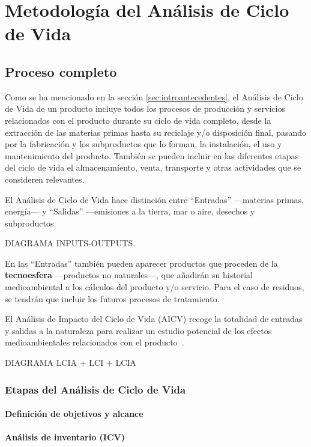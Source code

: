 \chapter{Metodología del Análisis de Ciclo de Vida}
\section{Proceso completo}

Como se ha mencionado en la sección \ref{sec:introantecedentes}, el Análisis de Ciclo de Vida de un producto incluye todos los procesos de producción y servicios relacionados con el producto durante su ciclo de vida completo, desde la extracción de las materias primas hasta su reciclaje y/o disposición final, pasando por la fabricación y los subproductos que lo forman, la instalación, el uso y mantenimiento del producto. También se pueden incluir en las diferentes etapas del ciclo de vida el almacenamiento, venta, transporte y otras actividades que se consideren relevantes.

El Análisis de Ciclo de Vida hace distinción entre ``Entradas'' —materias primas, energía— y ``Salidas'' —emisiones a la tierra, mar o aire, desechos y subproductos.

DIAGRAMA INPUTS-OUTPUTS.

En las ``Entradas'' también pueden aparecer productos que proceden de la \textbf{tecnoesfera} —productos no naturales—, que añadirán su historial medioambiental a los cálculos del producto y/o servicio. Para el caso de residuos, se tendrán que incluir los futuros procesos de tratamiento.

El Análisis de Impacto del Ciclo de Vida (AICV) recoge la totalidad de entradas y salidas a la naturaleza para realizar un estudio potencial de los efectos medioambientales relacionados con el producto \cite{iso14040}.

DIAGRAMA LCIA + LCI + LCIA

\subsection{Etapas del Análisis de Ciclo de Vida}
\subsubsection{Definición de objetivos y alcance}
\subsubsection{Análisis de inventario (ICV)}
